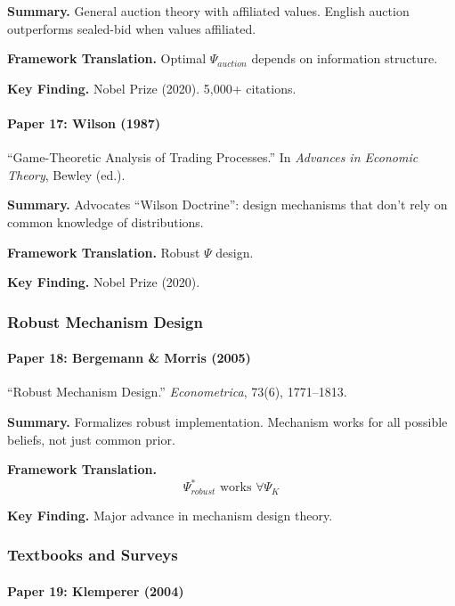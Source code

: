 \textbf{Summary.}
General auction theory with affiliated values. English auction outperforms 
sealed-bid when values affiliated.

\textbf{Framework Translation.}
Optimal $\Psi_{auction}$ depends on information structure.

\textbf{Key Finding.}
Nobel Prize (2020). 5,000+ citations.

\paragraph{Paper 17: Wilson (1987)}

``Game-Theoretic Analysis of Trading Processes.''
In \textit{Advances in Economic Theory}, Bewley (ed.).

\textbf{Summary.}
Advocates ``Wilson Doctrine'': design mechanisms that don't rely on 
common knowledge of distributions.

\textbf{Framework Translation.}
Robust $\Psi$ design.

\textbf{Key Finding.}
Nobel Prize (2020).

\subsubsection{Robust Mechanism Design}

\paragraph{Paper 18: Bergemann \& Morris (2005)}

``Robust Mechanism Design.''
\textit{Econometrica}, 73(6), 1771--1813.

\textbf{Summary.}
Formalizes robust implementation. Mechanism works for all possible 
beliefs, not just common prior.

\textbf{Framework Translation.}
\begin{equation}
\Psi^*_{robust} \text{ works } \forall \Psi_K
\end{equation}

\textbf{Key Finding.}
Major advance in mechanism design theory.

\subsubsection{Textbooks and Surveys}

\paragraph{Paper 19: Klemperer (2004)}

